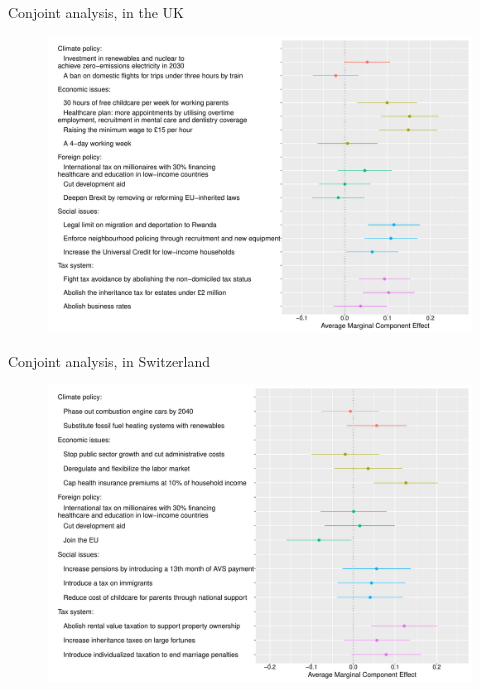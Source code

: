 \documentclass[aspectratio=169,xcolor=dvipsnames, 11pt,mathserif]{beamer}
\begin{document}
\begin{frame}{Conjoint analysis,  in the UK\label{conjoint_countries} \hyperlink{conjoint_country}{}} 
    \begin{figure} \vspace{-.14cm}
\includegraphics[height=.97\textheight]{../figures/all/conjoint_EN-GB.pdf}
\end{figure}
\end{frame}

\begin{frame}{Conjoint analysis,  in Switzerland\label{conjoint_countries} \hyperlink{conjoint_country}{}} 
    \begin{figure} \vspace{-.14cm}
\includegraphics[height=.97\textheight]{../figures/all/conjoint_EN-CH.pdf}
\end{figure}
\end{frame}
\end{document}
